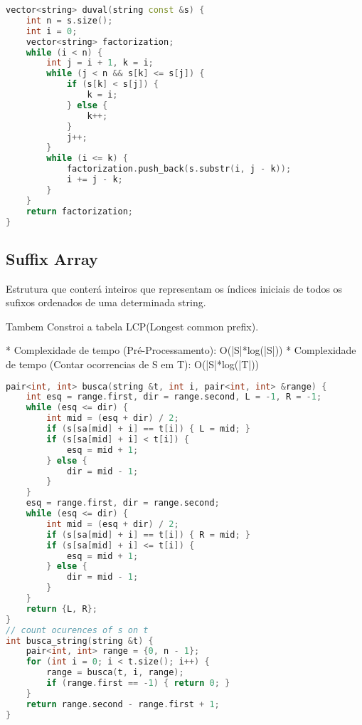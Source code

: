 \documentclass[11pt, a4paper, twoside]{article}
\begin{document}
\begin{lstlisting}[language=C++]
vector<string> duval(string const &s) {
    int n = s.size();
    int i = 0;
    vector<string> factorization;
    while (i < n) {
        int j = i + 1, k = i;
        while (j < n && s[k] <= s[j]) {
            if (s[k] < s[j]) {
                k = i;
            } else {
                k++;
            }
            j++;
        }
        while (i <= k) {
            factorization.push_back(s.substr(i, j - k));
            i += j - k;
        }
    }
    return factorization;
}
\end{lstlisting}

\subsection{Suffix Array}



Estrutura que conterá inteiros que representam os índices iniciais de todos os sufixos ordenados de uma determinada string.

Tambem Constroi a tabela LCP(Longest common prefix).

* Complexidade de tempo (Pré-Processamento): O(|S|*log(|S|))
* Complexidade de tempo (Contar ocorrencias de S em T): O(|S|*log(|T|))
\begin{lstlisting}[language=C++]
pair<int, int> busca(string &t, int i, pair<int, int> &range) {
    int esq = range.first, dir = range.second, L = -1, R = -1;
    while (esq <= dir) {
        int mid = (esq + dir) / 2;
        if (s[sa[mid] + i] == t[i]) { L = mid; }
        if (s[sa[mid] + i] < t[i]) {
            esq = mid + 1;
        } else {
            dir = mid - 1;
        }
    }
    esq = range.first, dir = range.second;
    while (esq <= dir) {
        int mid = (esq + dir) / 2;
        if (s[sa[mid] + i] == t[i]) { R = mid; }
        if (s[sa[mid] + i] <= t[i]) {
            esq = mid + 1;
        } else {
            dir = mid - 1;
        }
    }
    return {L, R};
}
// count ocurences of s on t
int busca_string(string &t) {
    pair<int, int> range = {0, n - 1};
    for (int i = 0; i < t.size(); i++) {
        range = busca(t, i, range);
        if (range.first == -1) { return 0; }
    }
    return range.second - range.first + 1;
}\end{lstlisting}
\end{document}
